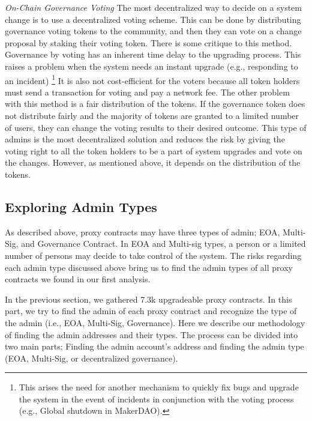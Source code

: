 \textit{On-Chain Governance Voting}
The most decentralized way to decide on a system change is to use a decentralized voting scheme. This can be done by distributing governance voting tokens to the community, and then they can vote on a change proposal by staking their voting token. 
There is some critique to this method. Governance by voting has an inherent time delay to the upgrading process. This raises a problem when the system needs an instant upgrade (e.g., responding to an incident) \footnote{This arises the need for another mechanism to quickly fix bugs and upgrade the system in the event of incidents in conjunction with the voting process (e.g., Global shutdown in MakerDAO).}
It is also not cost-efficient for the voters because all token holders must send a transaction for voting and pay a network fee.
The other problem with this method is a fair distribution of the tokens. If the governance token does not distribute fairly and the majority of tokens are granted to a limited number of users, they can change the voting results to their desired outcome. This type of admins is the most decentralized solution and reduces the risk by giving the voting right to all the token holders to be a part of system upgrades and vote on the changes. However, as mentioned above, it depends on the distribution of the tokens.

\subsection{Exploring Admin Types}
As described above, proxy contracts may have three types of admin; EOA, Multi-Sig, and Governance Contract. In EOA and Multi-sig types, a person or a limited number of persons may decide to take control of the system. The risks regarding each admin type discussed above bring us to find the admin types of all proxy contracts we found in our first analysis.

In the previous section, we gathered 7.3k upgradeable proxy contracts. In this part, we try to find the admin of each proxy contract and recognize the type of the admin (i.e., EOA, Multi-Sig, Governance).
Here we describe our methodology of finding the admin addresses and their types. The process can be divided into two main parts; Finding the admin account's address and finding the admin type (EOA, Multi-Sig, or decentralized governance).

